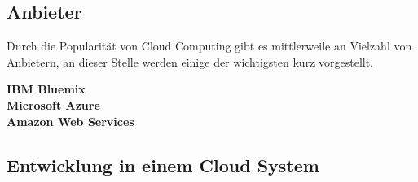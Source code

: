 \subsection{Anbieter}
Durch die Popularität von Cloud Computing gibt es mittlerweile an Vielzahl von Anbietern, an dieser Stelle werden einige der wichtigsten kurz vorgestellt.

\textbf{IBM Bluemix}\\
\textbf{Microsoft Azure}\\
\textbf{Amazon Web Services}\\

\subsection{Entwicklung in einem Cloud System}